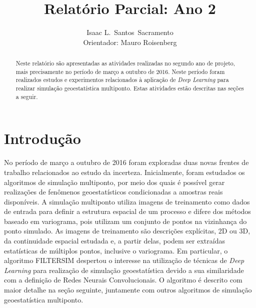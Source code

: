 \documentclass[11pt]{article}
\title{Relatório Parcial: Ano 2}
\author{Isaac L.\ Santos\ Sacramento \\ Orientador: Mauro Roisenberg}
\begin{document}
\lstset{language=C++,basicstyle=\small,
        stringstyle=\ttfamily,showstringspaces=false}

\singlespace
\maketitle

\begin{abstract}                %
Neste relatório são apresentadas as atividades realizadas no segundo ano de projeto, mais precisamente no
período de março a outubro de 2016. Neste período foram realizados estudos e experimentos relacionados à aplicação
de \textit{Deep Learning} para realizar simulação geoestatística multiponto. Estas atividades estão descritas
nas seções a seguir.

\end{abstract}

\doublespace
\setcounter{secnumdepth}{2}

\section{Introdução}

No período de março a outubro de 2016 foram exploradas duas novas frentes de trabalho relacionados ao estudo da incerteza.
Inicialmente, foram estudados os algoritmos de simulação multiponto, por meio dos quais é possível
gerar realizações de fenômenos geoestatísticos condicionadas a amostras reais disponíveis. A simulação multiponto utiliza
imagens de treinamento como dados de entrada para definir a estrutura espacial de um processo \cite{Guardiano1993} e difere
dos métodos baseado em variograma, pois utilizam um conjunto de pontos na vizinhança do ponto simulado.
As imagens de treinamento são descrições explícitas, 2D ou 3D, da continuidade espacial estudada e, a partir delas,
podem ser extraídas estatísticas de múltiplos pontos, inclusive o variograma.
Em particular, o algoritmo FILTERSIM despertou o interesse na utilização de técnicas de \textit{Deep Learning}
para realização de simulação geoestatística devido a sua similaridade com a definição de Redes Neurais Convolucionais. O algoritmo é descrito
com maior detalhe na seção seguinte, juntamente com outros algoritmos de simulação geoestatística multiponto.
\end{document}
